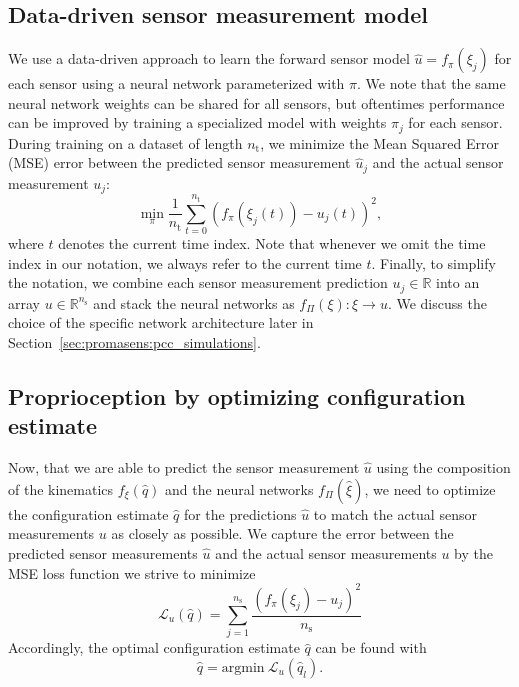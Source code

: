 \subsection{Data-driven sensor measurement model}
\label{sec:promasens:data_driven_approach}
We use a data-driven approach to learn the forward sensor model $\hat{u} = f_{\pi}(\xi_{j})$ for each sensor using a neural network parameterized with $\pi$.
We note that the same neural network weights can be shared for all sensors, but oftentimes performance can be improved by training a specialized model with weights $\pi_j$ for each sensor.
During training on a dataset of length $n_\mathrm{t}$, we minimize the Mean Squared Error (MSE) error between the predicted sensor measurement $\hat{u}_j$ and the actual sensor measurement $u_j$:
\begin{equation}
    \min_{\pi} \frac{1}{n_\mathrm{t}} \sum_{t = 0}^{n_\mathrm{t}} \left ( f_{\pi}(\xi_{j}(t)) - u_j(t) \right )^2,
\end{equation}
where $t$ denotes the current time index.
Note that whenever we omit the time index in our notation, we always refer to the current time $t$.
Finally, to simplify the notation, we combine each sensor measurement prediction $u_j \in \mathbb{R}$ into an array $u \in \mathbb{R}^{n_\mathrm{s}}$ and stack the neural networks as %
$f_\Pi(\xi): \xi \rightarrow u$. We discuss the choice of the specific network architecture later in Section~\ref{sec:promasens:pcc_simulations}.

\subsection{Proprioception by optimizing configuration estimate}
\label{sub:promasens:proprioception_optimization}

Now, that we are able to predict the sensor measurement $\hat{u}$ using the composition of the kinematics $f_\xi(\hat{q})$ and the neural networks $f_\Pi(\hat{\xi})$, we need to optimize the configuration estimate $\hat{q}$ for the predictions $\hat{u}$ to match the actual sensor measurements $u$ as closely as possible.
We capture the error between the predicted sensor measurements $\hat{u}$ and the actual sensor measurements $u$ by the MSE loss function we strive to minimize
\begin{equation}\label{eq:promasens:proprioception_loss}
    \mathcal{L}_{u}(\hat{q}) = \sum_{j=1}^{n_\mathrm{s}} \frac{\left ( f_\pi(\xi_j) - u_j \right )^2}{n_\mathrm{s}}
\end{equation}
Accordingly, the optimal configuration estimate $\hat{q}$ can be found with
\begin{equation}
    \hat{q} = \mathrm{argmin} \: \mathcal{L}_{u}(\hat{q}_l).
\end{equation}

